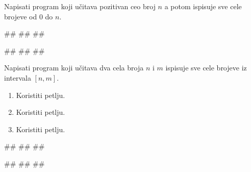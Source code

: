 \begin{Exercise}[label=1.3_3] 
Napisati program koji učitava pozitivan ceo broj $n$
a potom ispisuje sve cele brojeve od $0$ do $n$. 

\begin{miditest}
\begin{upotreba}{1}
#\naslovInt#
##
##
\end{upotreba}
\end{miditest}
\begin{miditest}
\begin{upotreba}{2}
#\naslovInt#
##
##
\end{upotreba}
\end{miditest}
\end{Exercise}
\begin{Answer}[ref=1.3_3]
\end{Answer}


\begin{Exercise}[label=1.3_4] 
Napisati program koji učitava dva cela broja $n$ i $m$ ispisuje sve
cele brojeve iz intervala $[n,m]$.
\begin{enumerate}
\item Koristiti  petlju.
\item Koristiti  petlju.
\item Koristiti  petlju.
 \end{enumerate}

\begin{miditest}
\begin{upotreba}{1}
#\naslovInt#
##
##
\end{upotreba}
\end{miditest}
\begin{miditest}
\begin{upotreba}{2}
#\naslovInt#
##
##
\end{upotreba}
\end{miditest}
\end{Exercise}
\begin{Answer}[ref=1.3_4]
\end{Answer}

